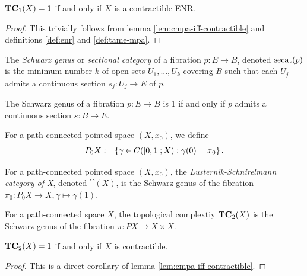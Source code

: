 \begin{remark}
    $\operatorname{\mathbf{TC}}_1(X) = 1$ if and only if $X$ is a contractible ENR.
    \begin{proof}
        This trivially follows from lemma \ref{lem:cmpa-iff-contractible} and definitions \ref{def:enr} and \ref{def:tame-mpa}.
    \end{proof}
\end{remark}

\begin{definition}\label{def:secat1}
    The \emph{Schwarz genus} or \emph{sectional category} of a fibration $p : E \to B$, denoted  $\operatorname{secat}(p)$ is the minimum number $k$ of open sets $U_1,...,U_k$ covering $B$ such that each $U_j$ admits a continuous section $s_j : U_j \to E$ of $p$.
\end{definition}

\begin{remark}\label{rem:secat1-iff-section}
    The Schwarz genus of a fibration $p : E \to B$ is 1 if and only if $p$ admits a continuous section $s : B \to E$.
\end{remark}

\begin{definition}
    For a path-connected pointed space $(X,x_0)$, we define
    \[
        P_0X := \left\{ \gamma \in C([0,1];X) : \gamma(0) = x_0 \right\}.
    \]
\end{definition}

\begin{definition}\label{def:LScat1}
    For a path-connected pointed space $(X,x_0)$, the \emph{Lusternik-Schnirelmann category of X}, denoted $\cat(X)$, is the Schwarz genus of the fibration $\pi_0 : P_0 X \to X, \gamma \mapsto \gamma(1)$.
\end{definition}

\begin{definition}\label{def:tc2}
    For a path-connected space $X$, the topological complextiy $\operatorname{\mathbf{TC}}_2(X)$ is the Schwarz genus of the fibration $\pi : PX \to X \times X$.
\end{definition}

\begin{remark}
    $\operatorname{\mathbf{TC}}_2(X) = 1$ if and only if $X$ is contractible.
    \begin{proof}
        This is a direct corollary of lemma \ref{lem:cmpa-iff-contractible}.
    \end{proof}
\end{remark}

